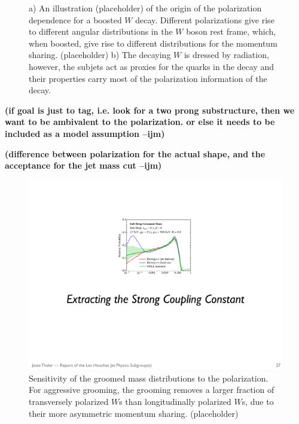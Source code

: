 \documentclass[11pt,letterpaper]{article}
\newcommand{\ijm}[1]{\textbf{\textcolor{llblue}{(#1 --ijm)}}}
\begin{document}
\begin{figure}
\begin{center}
\qquad
{}
\end{center}
\caption{a) An illustration (placeholder) of the origin of the polarization dependence for a boosted $W$ decay. Different polarizations give rise to different angular distributions in the $W$ boson rest frame, which, when boosted, give rise to different distributions for the momentum sharing. (placeholder) b) The decaying $W$ is dressed by radiation, however, the subjets act as proxies for the quarks in the decay and their properties carry most of the polarization information of the decay.
}
\label{fig:spin_boost}
\end{figure}






\ijm{if goal is just to tag, i.e. look for a two prong substructure, then we want to be ambivalent to the polarization. or else it needs to be included as a model assumption}

\ijm{difference between polarization for the actual shape, and the acceptance for the jet mass cut}


\begin{figure}
\begin{center}
\includegraphics[width=0.4\columnwidth]{figures/mass_placeholder}
\end{center}
\caption{Sensitivity of the groomed mass distributions to the polarization. For aggressive grooming, the grooming removes a larger fraction of transversely polarized $W$s than longitudinally polarized $W$s, due to their more asymmetric momentum sharing. (placeholder)}
\end{figure}
\end{document}
